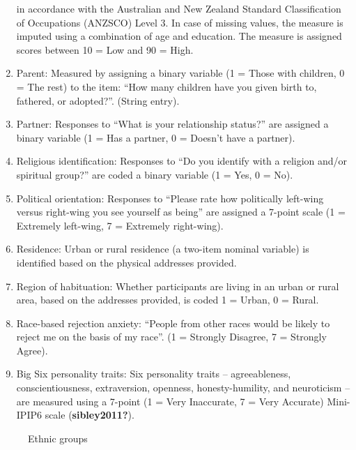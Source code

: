 \documentclass[
]{interact}
\begin{document}
\begin{enumerate}
  in accordance with the Australian and New Zealand Standard
  Classification of Occupations (ANZSCO) Level 3. In case of missing
  values, the measure is imputed using a combination of age and
  education. The measure is assigned scores between 10 = Low and 90 =
  High.
\item
  Parent: Measured by assigning a binary variable (1 = Those with
  children, 0 = The rest) to the item: ``How many children have you
  given birth to, fathered, or adopted?''. (String entry).
\item
  Partner: Responses to ``What is your relationship status?'' are
  assigned a binary variable (1 = Has a partner, 0 = Doesn't have a
  partner).
\item
  Religious identification: Responses to ``Do you identify with a
  religion and/or spiritual group?'' are coded a binary variable (1 =
  Yes, 0 = No).
\item
  Political orientation: Responses to ``Please rate how politically
  left-wing versus right-wing you see yourself as being'' are assigned a
  7-point scale (1 = Extremely left-wing, 7 = Extremely right-wing).
\item
  Residence: Urban or rural residence (a two-item nominal variable) is
  identified based on the physical addresses provided.
\item
  Region of habituation: Whether participants are living in an urban or
  rural area, based on the addresses provided, is coded 1 = Urban, 0 =
  Rural.
\item
  Race-based rejection anxiety: ``People from other races would be
  likely to reject me on the basis of my race''. (1 = Strongly Disagree,
  7 = Strongly Agree).
\item
  Big Six personality traits: Six personality traits -- agreeableness,
  conscientiousness, extraversion, openness, honesty-humility, and
  neuroticism -- are measured using a 7-point (1 = Very Inaccurate, 7 =
  Very Accurate) Mini-IPIP6 scale (\textbf{sibley2011?}).
\end{enumerate}

\begin{figure}


\caption{\label{fig-ethnicgroups}Ethnic groups}

\end{figure}%
\end{document}
